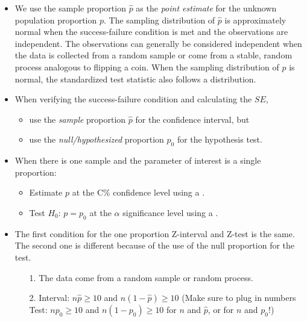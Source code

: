\begin{itemize} 

\item We use the sample proportion $\hat{p}$ as the \emph{point estimate} for the unknown population proportion $p$. The sampling distribution of $\hat{p}$ is approximately normal when the success-failure condition is met and the observations are independent.  The observations can generally be considered independent when the data is collected from a random sample or come from a stable, random process analogous to flipping a coin.  When the sampling distribution of $\hat{p}$ is normal, the standardized test statistic also follows a  distribution.

\item When verifying the success-failure condition and calculating the $SE$, \vspace{-1mm}
\begin{itemize}
\setlength{\itemsep}{0mm}
\item use the \emph{sample} proportion $\hat{p}$ for the confidence interval, but 
\item use the \emph{null/hypothesized} proportion $p_0$ for the hypothesis test.
\end{itemize}

\item When there is one sample and the parameter of interest is a single proportion:\begin{itemize}
 \item Estimate $p$ at the C\% confidence level using a .
\item Test $H_0$: $p=p_0$ at the $\alpha$ significance level using a .
\end{itemize}

\item The first condition for the one proportion Z-interval and Z-test is the same.  The second one is different because of the use of the null proportion for the test.
\begin{itemize}
\item[1.] The data come from a random sample or random process.
\item[2.] Interval:  $n\hat{p}\ge 10$ and $n(1-\hat{p})\ge 10$  \qquad \qquad  (Make sure to plug in numbers 
\\ Test: $np_0\ge 10$ and $n(1-p_0)\ge 10$  \qquad \qquad  \quad for  $n$ and $\hat{p}$, or for $n$ and $p_0$!)
\end{itemize}



\end{itemize}
